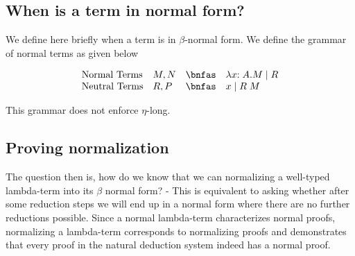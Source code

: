 \subsection*{When is a term in normal form?}

We define here briefly when a term is in $\beta$-normal form.
We define the grammar of normal terms as given below

\[
\begin{array}{llcl}
\mbox{Normal Terms}  & M,N & \bnfas & \lambda x{:A}. M \mid R \\
\mbox{Neutral Terms} & R, P & \bnfas & x \mid R\;M \\
  \end{array}
\]

This grammar does not enforce $\eta$-long.






\subsection*{Proving normalization}
The question then is, how do we know that we can normalizing a well-typed lambda-term into its $\beta$ normal form? - This is equivalent to asking whether after some reduction steps we will end up in a normal form where there are no further reductions possible. Since a normal lambda-term characterizes normal proofs, normalizing a lambda-term corresponds to normalizing proofs and demonstrates that every proof in the natural deduction system indeed has a normal proof. %

